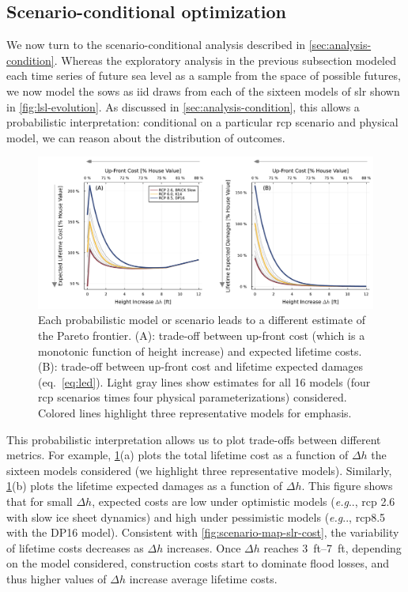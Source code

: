 \documentclass[12pt]{article}
\makeatletter
\DeclareRobustCommand\onedot{\futurelet\@let@token\@onedot}
\def\@onedot{\ifx\@let@token.\else.\null\fi\xspace}
\def\eg{\emph{e.g}\onedot} \def\Eg{\emph{E.g}\onedot}
\DeclareRobustCommand\onedot{\futurelet\@let@token\@onedot}
\def\@onedot{\ifx\@let@token.\else.\null\fi\xspace}
\def\eg{\emph{e.g}\onedot} \def\Eg{\emph{E.g}\onedot}
\makeatother
\begin{document}
\subsection{Scenario-conditional optimization}\label{sec:results-conditional}
We now turn to the scenario-conditional analysis described in \cref{sec:analysis-condition}.
Whereas the exploratory analysis in the previous subsection modeled each time series of future sea level as a sample from the space of possible futures, we now model the \glspl{sow} as \gls{iid} draws from each of the sixteen models of \gls{slr} shown in \cref{fig:lsl-evolution}.
As discussed in \cref{sec:analysis-condition}, this allows a probabilistic interpretation: conditional on a particular \gls{rcp} scenario and physical model, we can reason about the distribution of outcomes.

\begin{figure}
    \centering
    \includegraphics[width=\textwidth]{tradeoffs-by-rcp}
    \caption{
        Each probabilistic model or scenario leads to a different estimate of the Pareto frontier.
        (A): trade-off between up-front cost (which is a monotonic function of height increase) and expected lifetime costs.
        (B): trade-off between up-front cost and lifetime expected damages (eq.~\ref{eq:led}).
        Light gray lines show estimates for all 16 models (four \gls{rcp} scenarios times four physical parameterizations) considered.
        Colored lines highlight three representative models for emphasis.
    }\label{fig:tradeoffs-by-rcp}
\end{figure}

This probabilistic interpretation allows us to plot trade-offs between different metrics.
For example, \cref{fig:tradeoffs-by-rcp}(a) plots the total lifetime cost as a function of $\Delta h$ the sixteen models considered (we highlight three representative models).
Similarly, \cref{fig:tradeoffs-by-rcp}(b) plots the lifetime expected damages as a function of $\Delta h$.
This figure shows that for small $\Delta h$, expected costs are low under optimistic models (\eg, \gls{rcp} 2.6 with slow ice sheet dynamics) and high under pessimistic models (\eg, \gls{rcp}8.5 with the DP16 model).
Consistent with \cref{fig:scenario-map-slr-cost}, the variability of lifetime costs decreases as $\Delta h$ increases.
Once $\Delta h$ reaches \SIrange[]{3}{7}{ft}, depending on the model considered, construction costs start to dominate flood losses, and thus higher values of $\Delta h$ increase average lifetime costs.
\end{document}
